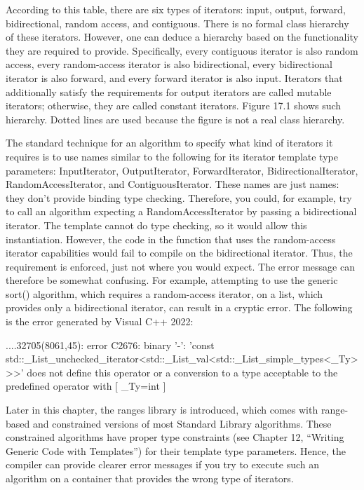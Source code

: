 According to this table, there are six types of iterators: input, output, forward, bidirectional, random access, and contiguous. There is no formal class hierarchy of these iterators. However, one can deduce a hierarchy based on the functionality they are required to provide. Specifically, every contiguous iterator is also random access, every random-access iterator is also bidirectional, every bidirectional iterator is also forward, and every forward iterator is also input. Iterators that additionally satisfy the requirements for output iterators are called mutable iterators; otherwise, they are called constant iterators. Figure 17.1 shows such hierarchy. Dotted lines are used because the figure is not a real class hierarchy.


The standard technique for an algorithm to specify what kind of iterators it requires is to use names similar to the following for its iterator template type parameters: InputIterator, OutputIterator, ForwardIterator, BidirectionalIterator, RandomAccessIterator, and ContiguousIterator. These names are just names: they don’t provide binding type checking. Therefore, you could, for example, try to call an algorithm expecting a RandomAccessIterator by passing a bidirectional iterator. The template cannot do type checking, so it would allow this instantiation. However, the code in the function that uses the random-access iterator capabilities would fail to compile on the bidirectional iterator. Thus, the requirement is enforced, just not where you would expect. The error message can therefore be somewhat confusing. For example, attempting to use the generic sort() algorithm, which requires a random-access iterator, on a list, which provides only a bidirectional iterator, can result in a cryptic error. The following is the error generated by Visual C++ 2022:

\begin{cpp}
...\MSVC{}.32705\algorithm(8061,45): error C2676: binary '-': 'const
std::_List_unchecked_iterator<std::_List_val<std::_List_simple_types<_Ty>>>' does
not define this operator or a conversion to a type acceptable to the
predefined operator
    with
    [
    _Ty=int
    ]
\end{cpp}

Later in this chapter, the ranges library is introduced, which comes with range-based and constrained versions of most Standard Library algorithms. These constrained algorithms have proper type constraints (see Chapter 12, “Writing Generic Code with Templates”) for their template type parameters. Hence, the compiler can provide clearer error messages if you try to execute such an algorithm on a container that provides the wrong type of iterators.

